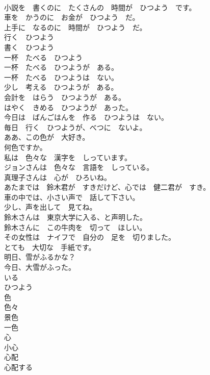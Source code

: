 \documentclass[8pt]{extreport}
\begin{document}
\begin{CJK}{UTF8}{min}
\\	小説を　書くのに　たくさんの　時間が　ひつよう　です。	
\\	車を　かうのに　お金が　ひつよう　だ。	
\\	上手に　なるのに　時間が　ひつよう　だ。	
\\	行く　ひつよう	
\\	書く　ひつよう	
\\	一杯　たべる　ひつよう	
\\	一杯　たべる　ひつようが　ある。	
\\	一杯　たべる　ひつようは　ない。	
\\	少し　考える　ひつようが　ある。	
\\	会計を　はらう　ひつようが　ある。	
\\	はやく　きめる　ひつようが　あった。	
\\	今日は　ばんごはんを　作る　ひつようは　ない。	
\\	毎日　行く　ひつようが、べつに　ないよ。	
\\	ああ、この色が　大好き。	
\\	何色ですか。	
\\	私は　色々な　漢字を　しっています。	
\\	ジョンさんは　色々な　言語を　しっている。	
\\	真理子さんは　心が　ひろいね。	
\\	あたまでは　鈴木君が　すきだけど、心では　健二君が　すき。	
\\	車の中では、小さい声で　話して下さい。	
\\	少し、声を出して　見てね。	
\\	鈴木さんは　東京大学に入る、と声明した。	
\\	鈴木さんに　この牛肉を　切って　ほしい。	
\\	その女性は　ナイフで　自分の　足を　切りました。	
\\	とても　大切な　手紙です。	
\\	明日、雪がふるかな？	
\\	今日、大雪がふった。	
\\	いる	
\\	ひつよう	
\\	色	
\\	色々	
\\	景色	
\\	一色	
\\	心	
\\	小心	
\\	心配	
\\	心配する	

\end{CJK}
\end{document}
